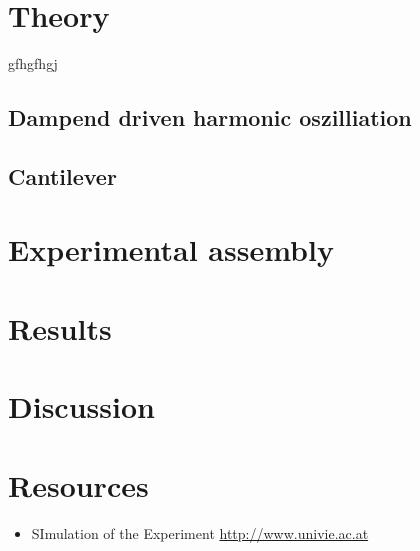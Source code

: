 \documentclass[12pt,a4paper]{article}
\begin{document}
\begin{multicols}{2}
\section{Theory}
gfhgfhgj
\subsection{Dampend driven harmonic oszilliation}

\subsection{Cantilever}

\section{Experimental assembly}


\section{Results}





\section{Discussion}


\section{Resources}
\begin{itemize}
	\item SImulation of the Experiment \url{http://www.univie.ac.at}
\end{itemize}
%
%

\end{multicols}
\end{document}
